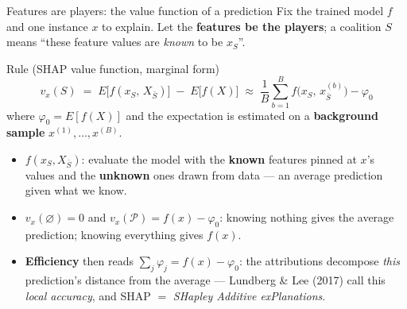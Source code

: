 \documentclass[aspectratio=169,11pt]{beamer}
\begin{document}
\begin{frame}{Features are players: the value function of a prediction}
  \scriptsize
  Fix the trained model $f$ and one instance $x$ to explain. Let the
  \textbf{features be the players}; a coalition $S$ means ``these feature values
  are \emph{known} to be $x_S$''.
  \begin{block}{Rule (SHAP value function, marginal form)}
    \[
      \boxed{\;v_x(S) \;=\; E\bigl[f(x_S,\,X_{\bar S})\bigr] \;-\; E\bigl[f(X)\bigr]
      \;\approx\; \frac1B\sum_{b=1}^{B} f\bigl(x_S,\,x^{(b)}_{\bar S}\bigr) - \varphi_0\;}
    \]
    where $\varphi_0 = E[f(X)]$ and the expectation is estimated on a
    \textbf{background sample} $x^{(1)},\dots,x^{(B)}$.
  \end{block}
  \begin{readme}
    \begin{itemize}
      \item $f(x_S, X_{\bar S})$: evaluate the model with the \textbf{known}
            features pinned at $x$'s values and the \textbf{unknown} ones drawn
            from data --- an average prediction given what we know.
      \item $v_x(\varnothing)=0$ and $v_x(\mathcal{P})=f(x)-\varphi_0$: knowing
            nothing gives the average prediction; knowing everything gives $f(x)$.
      \item \textbf{Efficiency} then reads $\sum_j \varphi_j = f(x) - \varphi_0$:
            the attributions decompose \emph{this} prediction's distance from the
            average --- Lundberg \& Lee (2017) call this \emph{local accuracy},
            and SHAP $=$ \emph{SHapley Additive exPlanations}.
    \end{itemize}
  \end{readme}
\end{frame}
\end{document}
